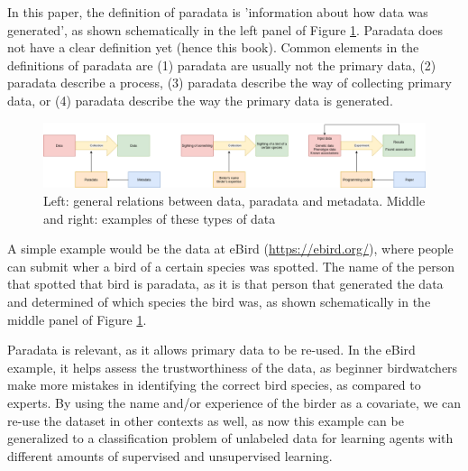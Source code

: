 
In this paper, the definition of paradata
is 'information about how data was generated',
as shown schematically in the left panel of Figure \ref{fig:figure_1}.
Paradata does not have a clear definition yet (hence this book). 
Common elements in the definitions of paradata are 
(1) paradata are usually not the primary data, (2) paradata describe
a process, (3) paradata describe the way of collecting primary data, or 
(4) paradata describe the way the primary data is generated.

\begin{figure}[!htbp]
  \centering
  \includegraphics[width=\linewidth]{figure_1.png}
  \caption{
    Left: general relations between data, paradata and metadata.
    Middle and right: examples of these types of data
  }
  \label{fig:figure_1}
\end{figure}


A simple example would be the data at eBird (\url{https://ebird.org/}),
where people can submit wher a bird of a certain species was spotted.
The name of the person that spotted that bird is paradata, 
as it is that person that generated the data and determined of
which species the bird was, 
as shown schematically in the middle panel of Figure \ref{fig:figure_1}.


Paradata is relevant, as it allows primary data to be re-used.
In the eBird example, it helps assess the trustworthiness of the 
data, as beginner birdwatchers make more mistakes in identifying
the correct bird species, as compared to experts.
By using the name and/or experience of the birder as a covariate,
we can re-use the dataset in other contexts as well,
as now this example can be generalized to
a classification problem of unlabeled
data for learning agents with different amounts 
of supervised and unsupervised learning.

